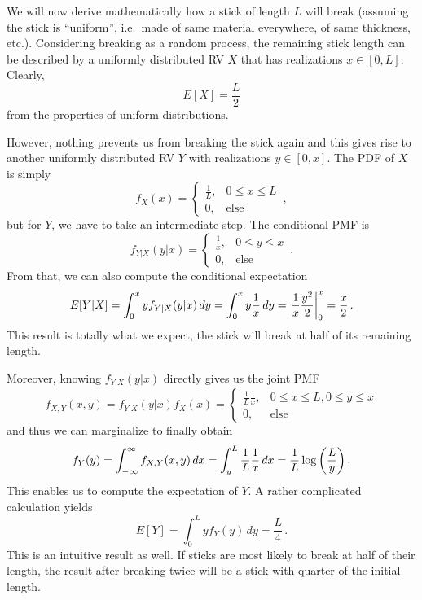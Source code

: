 \begin{ex}\label{ex:broken_stick}
We will now derive mathematically how a stick of length $L$ will break (assuming the stick is \enquote{uniform}, i.e.~made of same material everywhere, of same thickness, etc.). Considering breaking as a random process, the remaining stick length can be described by a uniformly distributed RV $X$ that has realizations $x \in [0, L]$. Clearly,
\begin{equation*}
E[X] = \frac{L}{2}
\end{equation*}
from the properties of uniform distributions.

However, nothing prevents us from breaking the stick again and this gives rise to another uniformly distributed RV $Y$ with realizations $y \in [0, x]$. The PDF of $X$ is simply
\begin{equation*}
f_X(x) = \begin{cases} \frac{1}{L}, & 0 \leq x \leq L \\ 0, & \text{else} \end{cases} \, ,
\end{equation*}
but for $Y$, we have to take an intermediate step. The conditional PMF is
\begin{equation*}
f_{Y | X}(y | x) = \begin{cases} \frac{1}{x}, & 0 \leq y \leq x \\ 0, & \text{else} \end{cases} \, .
\end{equation*}
From that, we can also compute the conditional expectation
\begin{equation*}
E[Y | X] = \int_0^x y f_{Y | X}(y | x) \, dy = \int_0^x y \frac{1}{x} \, dy = \eval{\frac{1}{x} \frac{y^2}{2}}_0^x = \frac{x}{2} \, .
\end{equation*}
This result is totally what we expect, the stick will break at half of its remaining length.

Moreover, knowing $f_{Y | X}(y | x)$ directly gives us the joint PMF
\begin{equation*}
f_{X, Y}(x, y) = f_{Y | X}(y | x) f_X(x) = \begin{cases} \frac{1}{L} \frac{1}{x}, & 0 \leq x \leq L, 0 \leq y \leq x \\ 0, & \text{else} \end{cases}
\end{equation*}
and thus we can marginalize to finally obtain
\begin{equation*}
f_Y(y) = \int_{- \infty}^\infty f_{X, Y}(x, y) \, dx = \int_y^L \frac{1}{L} \frac{1}{x} \, dx = \frac{1}{L} \log\qty(\frac{L}{y}) \, .
\end{equation*}
This enables us to compute the expectation of $Y$. A rather complicated calculation yields
\begin{equation*}
E[Y] = \int_0^L y f_Y(y) \, dy = \frac{L}{4} \, .
\end{equation*}
This is an intuitive result as well. If sticks are most likely to break at half of their length, the result after breaking twice will be a stick with quarter of the initial length.
\end{ex}



